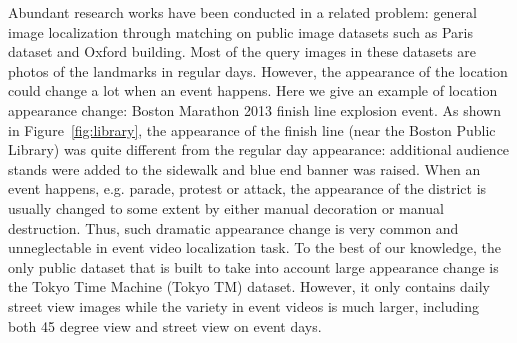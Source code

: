Abundant research works have been conducted in a related problem: general image localization through matching\cite{arandjelovic2013,choy_nips16,Arandjelovic16,hays2008im2gps} on public image datasets such as Paris dataset\cite{philbin08lost} and Oxford building\cite{philbin07object}.
Most of the query images in these datasets are photos of the landmarks in regular days. 
However, the appearance of the location could change a lot when an event happens. 
Here we give an example of location appearance change: Boston Marathon 2013 finish line explosion event. 
As shown in Figure~\ref{fig:library}, the appearance of the finish line (near the Boston Public Library) was quite different from the regular day appearance: additional audience stands were added to the sidewalk and blue end banner was raised. 
When an event happens, e.g. parade, protest or attack, the appearance of the district is usually changed to some extent by either manual decoration or manual destruction. 
Thus, such dramatic appearance change is very common and unneglectable in event video localization task. 
To the best of our knowledge, the only public dataset that is built to take into account large appearance change is the Tokyo Time Machine (Tokyo TM) dataset\cite{Arandjelovic16}.  
However, it only contains daily street view images while the variety in event videos is much larger, including both 45 degree view and street view on event days. 

